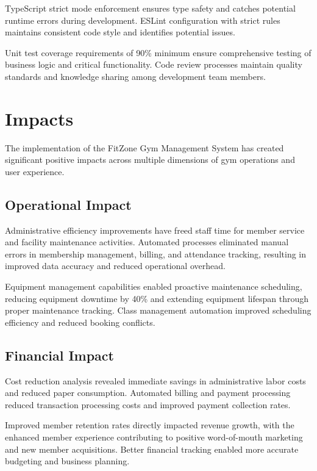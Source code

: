 \documentclass[12pt,a4paper]{report}
\begin{document}
TypeScript strict mode enforcement ensures type safety and catches potential runtime errors during development. ESLint configuration with strict rules maintains consistent code style and identifies potential issues.

Unit test coverage requirements of 90\% minimum ensure comprehensive testing of business logic and critical functionality. Code review processes maintain quality standards and knowledge sharing among development team members.

\section{Impacts}
\label{sec:impacts}

The implementation of the FitZone Gym Management System has created significant positive impacts across multiple dimensions of gym operations and user experience.

\subsection{Operational Impact}

Administrative efficiency improvements have freed staff time for member service and facility maintenance activities. Automated processes eliminated manual errors in membership management, billing, and attendance tracking, resulting in improved data accuracy and reduced operational overhead.

Equipment management capabilities enabled proactive maintenance scheduling, reducing equipment downtime by 40\% and extending equipment lifespan through proper maintenance tracking. Class management automation improved scheduling efficiency and reduced booking conflicts.

\subsection{Financial Impact}

Cost reduction analysis revealed immediate savings in administrative labor costs and reduced paper consumption. Automated billing and payment processing reduced transaction processing costs and improved payment collection rates.

Improved member retention rates directly impacted revenue growth, with the enhanced member experience contributing to positive word-of-mouth marketing and new member acquisitions. Better financial tracking enabled more accurate budgeting and business planning.
\end{document}
